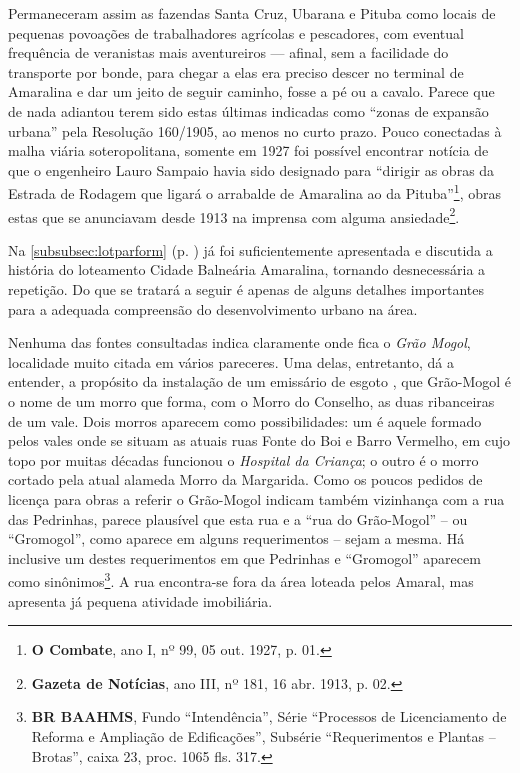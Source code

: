 Permaneceram assim as fazendas Santa Cruz, Ubarana e Pituba como locais de pequenas povoações de trabalhadores agrícolas e pescadores, com eventual frequência de veranistas mais aventureiros --- afinal, sem a facilidade do transporte por bonde, para chegar a elas era preciso descer no terminal de Amaralina e dar um jeito de seguir caminho, fosse a pé ou a cavalo. Parece que de nada adiantou terem sido estas últimas indicadas como ``zonas de expansão urbana'' pela Resolução 160/1905, ao menos no curto prazo. Pouco conectadas à malha viária soteropolitana, somente em 1927 foi possível encontrar notícia de que o engenheiro Lauro Sampaio havia sido designado para ``dirigir as obras da Estrada de Rodagem que ligará o arrabalde de Amaralina ao da Pituba''\footnote{\textbf{O Combate}, ano I, nº 99, 05 out. 1927, p. 01.}, obras estas que se anunciavam desde 1913 na imprensa com alguma ansiedade\footnote{\textbf{Gazeta de Notícias}, ano III, nº 181, 16 abr. 1913, p. 02.}.

Na \autoref{subsubsec:lotparform} (p. \pageref{subsubsec:lotparform}) já foi suficientemente apresentada e discutida a história do loteamento Cidade Balneária Amaralina, tornando desnecessária a repetição. Do que se tratará a seguir é apenas de alguns detalhes importantes para a adequada compreensão do desenvolvimento urbano na área. 





Nenhuma das fontes consultadas indica claramente onde fica o \textit{Grão Mogol}, localidade muito citada em vários pareceres. Uma delas, entretanto, dá a entender, a propósito da instalação de um emissário de esgoto \cite{bahia_rpe_1895}, que Grão-Mogol é o nome de um morro que forma, com o Morro do Conselho, as duas ribanceiras de um vale. Dois morros aparecem como possibilidades: um é aquele formado pelos vales onde se situam as atuais ruas Fonte do Boi e Barro Vermelho, em cujo topo por muitas décadas funcionou o \textit{Hospital da Criança}; o outro é o morro cortado pela atual alameda Morro da Margarida. Como os poucos pedidos de licença para obras a referir o Grão-Mogol indicam também vizinhança com a rua das Pedrinhas, parece plausível que esta rua e a ``rua do Grão-Mogol'' -- ou ``Gromogol'', como aparece em alguns requerimentos -- sejam a mesma. Há inclusive um destes requerimentos em que Pedrinhas e ``Gromogol'' aparecem como sinônimos\footnote{\textbf{BR BAAHMS}, Fundo ``Intendência'', Série ``Processos de Licenciamento de Reforma e Ampliação de Edificações'', Subsérie ``Requerimentos e Plantas -- Brotas'', caixa 23, proc. 1065 fls. 317.}. A rua encontra-se fora da área loteada pelos Amaral, mas apresenta já pequena atividade imobiliária.

